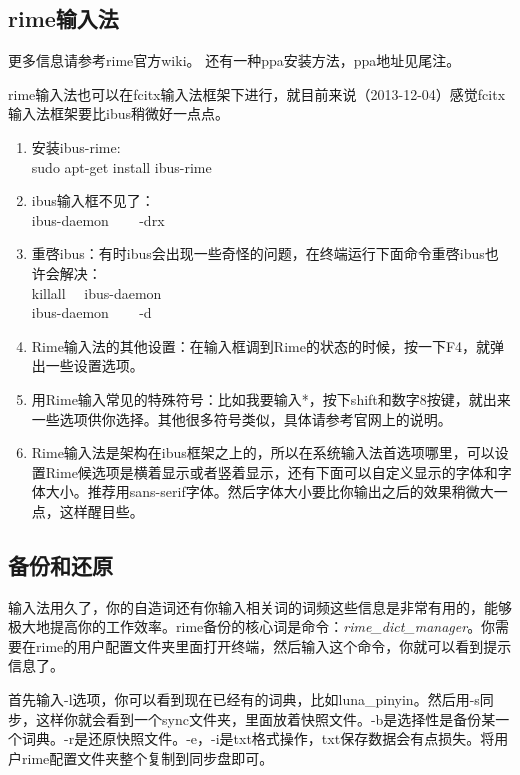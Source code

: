 \documentclass[11pt,oneside]{book}
\begin{document}
\begin{common-format}
\section{rime输入法}
更多信息请参考rime官方wiki。
还有一种ppa安装方法，ppa地址见尾注。

rime输入法也可以在fcitx输入法框架下进行，就目前来说（2013-12-04）感觉fcitx输入法框架要比ibus稍微好一点点。

\begin{enumerate}
\item 安装ibus-rime:\\ sudo apt-get install ibus-rime
\item ibus输入框不见了：\\ ibus-daemon  ~~~  -drx
\item 重啓ibus：有时ibus会出现一些奇怪的问题，在终端运行下面命令重啓ibus也许会解决：\\ killall ~~ibus-daemon\\
             ibus-daemon ~~~ -d
\item Rime输入法的其他设置：在输入框调到Rime的状态的时候，按一下F4，就弹出一些设置选项。
\item 用Rime输入常见的特殊符号：比如我要输入*，按下shift和数字8按键，就出来一些选项供你选择。其他很多符号类似，具体请参考官网上的说明。
\item Rime输入法是架构在ibus框架之上的，所以在系统输入法首选项哪里，可以设置Rime候选项是横着显示或者竖着显示，还有下面可以自定义显示的字体和字体大小。推荐用sans-serif字体。然后字体大小要比你输出之后的效果稍微大一点，这样醒目些。
\end{enumerate}

\subsection{备份和还原}
输入法用久了，你的自造词还有你输入相关词的词频这些信息是非常有用的，能够极大地提高你的工作效率。rime备份的核心词是命令：\emph{rime\_{}dict\_{}manager}。你需要在rime的用户配置文件夹里面打开终端，然后输入这个命令，你就可以看到提示信息了。

首先输入-l选项，你可以看到现在已经有的词典，比如luna\_{}pinyin。然后用-s同步，这样你就会看到一个sync文件夹，里面放着快照文件。-b是选择性是备份某一个词典。-r是还原快照文件。-e，-i是txt格式操作，txt保存数据会有点损失。将用户rime配置文件夹整个复制到同步盘即可。


\end{common-format}
\end{document}
